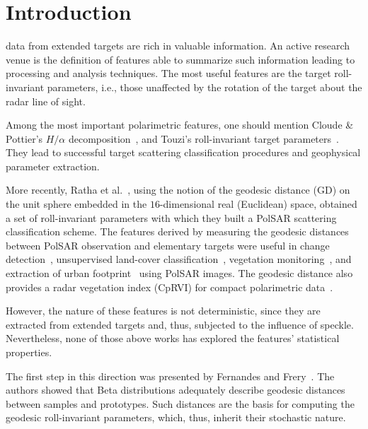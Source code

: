 \documentclass[journal]{IEEEtran}
\begin{document}
\section{Introduction}

data from extended targets are rich in valuable information.
An active research venue is the definition of features able to summarize such information leading to processing and analysis techniques.
The most useful features are the target roll-invariant parameters, i.e., those unaffected by the rotation of the target about the radar line of sight.

Among the most important polarimetric features, one should mention Cloude \& Pottier's $H/\alpha$ decomposition~\cite{CloudePottier:97}, and Touzi's roll-invariant target parameters~\cite{Touzi:TGARS:2007}.
They lead to successful target scattering classification procedures and geophysical parameter extraction.

More recently, Ratha et al.~\cite{APolSARScatteringPowerFactorizationFrameworkandNovelRollInvariantParametersBasedUnsupervisedClassificationSchemeUsingaGeodesicDistanceinpress}, using the notion of the geodesic distance ($\text{GD}$) on the unit sphere embedded in the $16$-dimensional real (Euclidean) space, obtained a set of roll-invariant parameters with which they built a PolSAR scattering classification scheme. 
The features derived by measuring the geodesic distances between PolSAR observation and elementary targets were useful in
change detection~\cite{ChangeDetectionPolSARGeodesicDistanceBetweenScatteringMechanisms},
unsupervised land-cover classification~\cite{ClassificationPolSARGeodesic}, 
vegetation monitoring~\cite{AGeneralizedVolumeScatteringModelBasedVegetationIndexfromPolarimetricSARData2019}, and 
extraction of urban footprint~\cite{NovelTechniquesforBuiltupAreaExtractionfromPolarimetricSARImages2019} using PolSAR images.
The geodesic distance also provides a radar vegetation index (CpRVI) for compact polarimetric data~\cite{ARadarVegetationIndexforCropMonitoringUsingCompactPolarimetricSARData}. 

However, the nature of these features is not deterministic, since they are extracted from extended targets and, thus, subjected to the influence of speckle.
Nevertheless, none of those above works has explored the features' statistical properties.

The first step in this direction was presented by Fernandes and Frery~\cite{StatisticalPropertiesofGeodesicDistancesBetweenSamplesandElementaryScatterersinPolSARImagery2019}.
The authors showed that Beta distributions adequately describe geodesic distances between samples and prototypes.
Such distances are the basis for computing the geodesic roll-invariant parameters, which, thus, inherit their stochastic nature.
\end{document}
